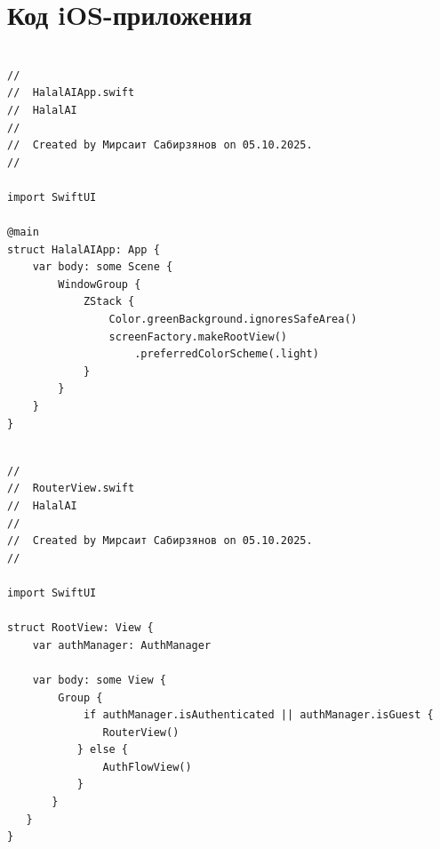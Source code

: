 \chapter{Код iOS-приложения}\label{app:ios}
\setcounter{tocdepth}{-1}\setcounter{secnumdepth}{-1}

\begin{lstlisting}[basicstyle=\tiny\ttfamily,breaklines=true]

//
//  HalalAIApp.swift
//  HalalAI
//
//  Created by Мирсаит Сабирзянов on 05.10.2025.
//

import SwiftUI

@main
struct HalalAIApp: App {
    var body: some Scene {
        WindowGroup {
            ZStack {
                Color.greenBackground.ignoresSafeArea()
                screenFactory.makeRootView()
                    .preferredColorScheme(.light)
            }
        }
    }
}
\end{lstlisting}

\begin{lstlisting}[basicstyle=\tiny\ttfamily,breaklines=true]

//
//  RouterView.swift
//  HalalAI
//
//  Created by Мирсаит Сабирзянов on 05.10.2025.
//

import SwiftUI

struct RootView: View {
    var authManager: AuthManager
    
    var body: some View {
        Group {
            if authManager.isAuthenticated || authManager.isGuest {
               RouterView()
           } else {
               AuthFlowView()
           }
       }
   }
}
\end{lstlisting}


